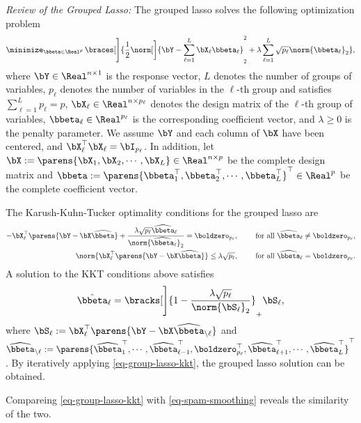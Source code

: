 \documentclass[12pt]{article}
\begin{document}
\begin{enumerate}[label=\textbf{\arabic*.}]
	\textit{Review of the Grouped Lasso:} The grouped lasso solves the following optimization problem 
	\begin{align}\label{eq-group-lasso}
		\minimize_{\bbeta \in \Real^{p}} \, \braces[\Bigg]{\frac{1}{2} \norm[\bigg]{\bY - \sum_{{\ell}=1}^L \bX_{{\ell}} \bbeta_{\ell} }_2^2 + \lambda \sum_{\ell=1}^L \sqrt{p_{\ell}} \norm{\bbeta_{\ell}}_2 }, 
	\end{align}
	where $\bY \in \Real^{n \times 1}$ is the response vector, $L$ denotes the number of groups of variables, $p_{\ell}$ denotes the number of variables in the $\ell$-th group and satisfies $\sum_{\ell=1}^L p_{\ell} = p$, $\bX_{\ell} \in \Real^{n \times p_{\ell}}$ denotes the design matrix of the $\ell$-th group of variables, $\bbeta_{\ell} \in \Real^{p_{\ell}}$ is the corresponding coefficient vector, and $\lambda \ge 0$ is the penalty parameter. We assume $\bY$ and each column of $\bX$ have been centered, and $\bX_{\ell}^\top \bX_{\ell} = \bI_{p_{\ell}}$. In addition, let $\bX := \parens{\bX_1, \bX_2, \cdots, \bX_L} \in \Real^{n \times p}$ be the complete design matrix and $\bbeta := \parens{\bbeta_1^\top, \bbeta_2^\top, \cdots, \bbeta_L^\top}^\top \in \Real^p$ be the complete coefficient vector. 
	
	The Karush-Kuhn-Tucker optimality conditions for the grouped lasso are 
	\begin{align*}
		- \bX_\ell^\top \parens{\bY - \bX \widehat{\bbeta}} + \frac{\lambda \sqrt{p_{\ell}} \widehat{\bbeta}_{\ell}}{\norm{\widehat{\bbeta}_{\ell}}_2} = \boldzero_{p_{\ell}}, \qquad \text{ for all } \widehat{\bbeta}_{\ell} \neq \boldzero_{p_{\ell}}, \\ 
		\norm{\bX_\ell^\top \parens{\bY - \bX \widehat{\bbeta}}} \le \lambda \sqrt{p_{\ell}}, \qquad \text{ for all } \widehat{\bbeta}_{\ell} = \boldzero_{p_{\ell}}. 
	\end{align*}
	A solution to the KKT conditions above satisfies 
	\begin{align}\label{eq-group-lasso-kkt}
		\hat{\bbeta}_\ell = \bracks[\Bigg]{1 - \frac{\lambda \sqrt{p_{\ell}}}{\norm{\bS_\ell}_2}}_+ \bS_\ell, 
	\end{align}
	where $\bS_{\ell} := \bX_\ell^\top \parens{\bY - \bX \widehat{\bbeta}_{\backslash \ell}}$ and $\widehat{\bbeta}_{\backslash \ell} := \parens{\widehat{\bbeta}_1^\top, \cdots, \widehat{\bbeta}_{\ell-1}^\top, \boldzero_{p_{\ell}}^\top, \widehat{\bbeta}_{\ell+1}^\top, \cdots, \widehat{\bbeta}_L^\top}^\top$. By iteratively applying \eqref{eq-group-lasso-kkt}, the grouped lasso solution can be obtained. 
	
	Compareing \eqref{eq-group-lasso-kkt} with \eqref{eq-spam-smoothing} reveals the similarity of the two. 

\end{enumerate}
\end{document}
